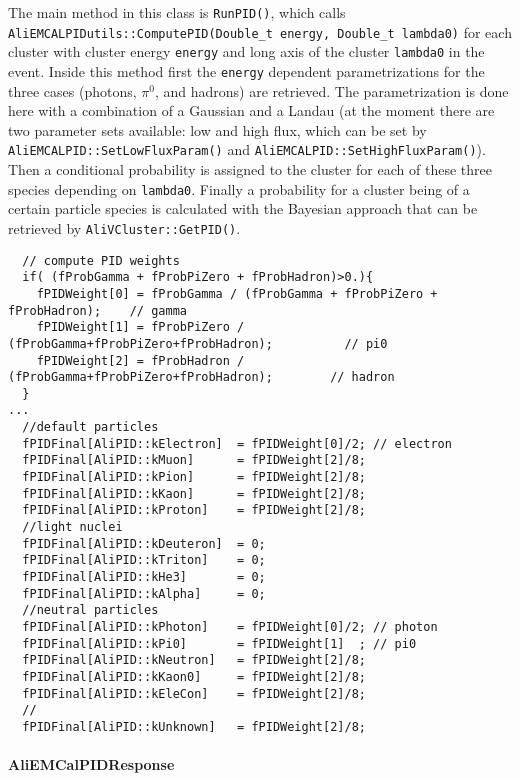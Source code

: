 The main method in this class is \texttt{RunPID()}, which calls \texttt{AliEMCALPIDutils::ComputePID(Double\_t energy, Double\_t lambda0)} for each cluster with cluster energy \texttt{energy} and long axis of the cluster \texttt{lambda0} in the event. Inside this method first the \texttt{energy} dependent parametrizations for the three cases (photons, $\pi^{0}$, and hadrons) are retrieved. The parametrization is done here with a combination of a Gaussian and a Landau (at the moment there are two parameter sets available: low and high flux, which can be set by \texttt{AliEMCALPID::SetLowFluxParam()} and  \texttt{AliEMCALPID::SetHighFluxParam()}). Then a conditional probability is assigned to the cluster for each of these three species depending on \texttt{lambda0}. Finally a probability for a cluster being of a certain particle species is calculated with the Bayesian approach that can be retrieved by \texttt{AliVCluster::GetPID()}.\\
\begin{DDbox}{\linewidth}
\begin{lstlisting}
  // compute PID weights
  if( (fProbGamma + fProbPiZero + fProbHadron)>0.){
    fPIDWeight[0] = fProbGamma / (fProbGamma + fProbPiZero + fProbHadron);    // gamma
    fPIDWeight[1] = fProbPiZero / (fProbGamma+fProbPiZero+fProbHadron);          // pi0
    fPIDWeight[2] = fProbHadron / (fProbGamma+fProbPiZero+fProbHadron);        // hadron
  }
...
  //default particles
  fPIDFinal[AliPID::kElectron]  = fPIDWeight[0]/2; // electron
  fPIDFinal[AliPID::kMuon]      = fPIDWeight[2]/8;
  fPIDFinal[AliPID::kPion]      = fPIDWeight[2]/8;
  fPIDFinal[AliPID::kKaon]      = fPIDWeight[2]/8;
  fPIDFinal[AliPID::kProton]    = fPIDWeight[2]/8;
  //light nuclei
  fPIDFinal[AliPID::kDeuteron]  = 0;
  fPIDFinal[AliPID::kTriton]    = 0;
  fPIDFinal[AliPID::kHe3]       = 0;
  fPIDFinal[AliPID::kAlpha]     = 0;
  //neutral particles
  fPIDFinal[AliPID::kPhoton]    = fPIDWeight[0]/2; // photon
  fPIDFinal[AliPID::kPi0]       = fPIDWeight[1]  ; // pi0
  fPIDFinal[AliPID::kNeutron]   = fPIDWeight[2]/8;
  fPIDFinal[AliPID::kKaon0]     = fPIDWeight[2]/8;
  fPIDFinal[AliPID::kEleCon]    = fPIDWeight[2]/8;
  //
  fPIDFinal[AliPID::kUnknown]   = fPIDWeight[2]/8;
\end{lstlisting}
\end{DDbox}





\paragraph{AliEMCalPIDResponse}

